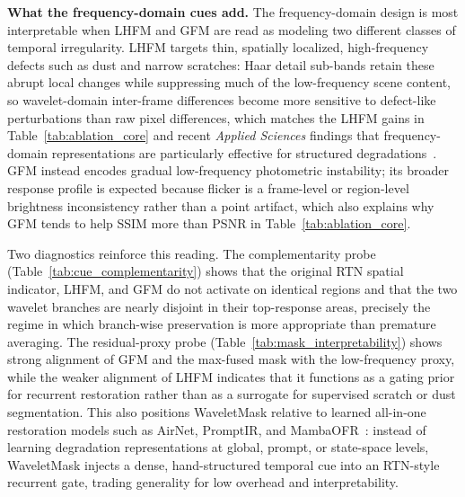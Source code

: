 \textbf{What the frequency-domain cues add.}
The frequency-domain design is most interpretable when LHFM and GFM are read as modeling two different classes of temporal irregularity. LHFM targets thin, spatially localized, high-frequency defects such as dust and narrow scratches: Haar detail sub-bands retain these abrupt local changes while suppressing much of the low-frequency scene content, so wavelet-domain inter-frame differences become more sensitive to defect-like perturbations than raw pixel differences, which matches the LHFM gains in Table~\ref{tab:ablation_core} and recent \textit{Applied Sciences} findings that frequency-domain representations are particularly effective for structured degradations~\cite{kim2025hybrid,park2025spatialfrequency}. GFM instead encodes gradual low-frequency photometric instability; its broader response profile is expected because flicker is a frame-level or region-level brightness inconsistency rather than a point artifact, which also explains why GFM tends to help SSIM more than PSNR in Table~\ref{tab:ablation_core}.

Two diagnostics reinforce this reading. The complementarity probe (Table~\ref{tab:cue_complementarity}) shows that the original RTN spatial indicator, LHFM, and GFM do not activate on identical regions and that the two wavelet branches are nearly disjoint in their top-response areas, precisely the regime in which branch-wise preservation is more appropriate than premature averaging. The residual-proxy probe (Table~\ref{tab:mask_interpretability}) shows strong alignment of GFM and the max-fused mask with the low-frequency proxy, while the weaker alignment of LHFM indicates that it functions as a gating prior for recurrent restoration rather than as a surrogate for supervised scratch or dust segmentation. This also positions WaveletMask relative to learned all-in-one restoration models such as AirNet, PromptIR, and MambaOFR~\cite{li2022airnet,potlapalli2023promptir,mao2025mambaofr}: instead of learning degradation representations at global, prompt, or state-space levels, WaveletMask injects a dense, hand-structured temporal cue into an RTN-style recurrent gate, trading generality for low overhead and interpretability.


